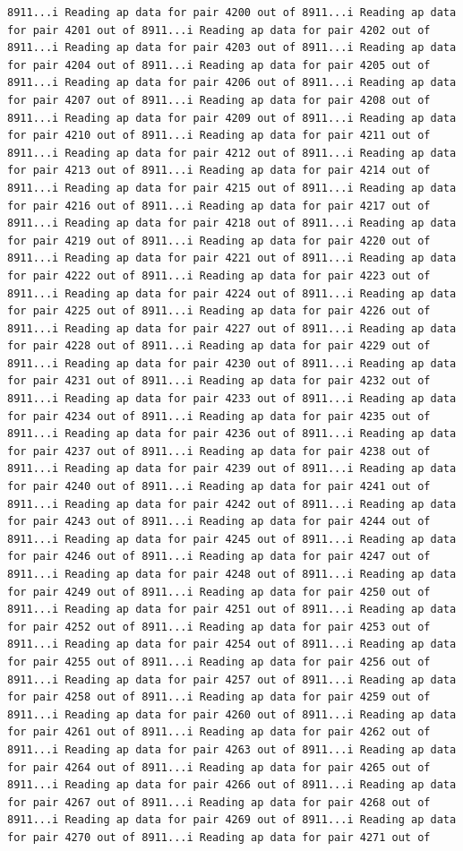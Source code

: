 \documentclass[
]{article}
\begin{document}
\begin{verbatim}
8911...i Reading ap data for pair 4200 out of 8911...i Reading ap data for pair 4201 out of 8911...i Reading ap data for pair 4202 out of 8911...i Reading ap data for pair 4203 out of 8911...i Reading ap data for pair 4204 out of 8911...i Reading ap data for pair 4205 out of 8911...i Reading ap data for pair 4206 out of 8911...i Reading ap data for pair 4207 out of 8911...i Reading ap data for pair 4208 out of 8911...i Reading ap data for pair 4209 out of 8911...i Reading ap data for pair 4210 out of 8911...i Reading ap data for pair 4211 out of 8911...i Reading ap data for pair 4212 out of 8911...i Reading ap data for pair 4213 out of 8911...i Reading ap data for pair 4214 out of 8911...i Reading ap data for pair 4215 out of 8911...i Reading ap data for pair 4216 out of 8911...i Reading ap data for pair 4217 out of 8911...i Reading ap data for pair 4218 out of 8911...i Reading ap data for pair 4219 out of 8911...i Reading ap data for pair 4220 out of 8911...i Reading ap data for pair 4221 out of 8911...i Reading ap data for pair 4222 out of 8911...i Reading ap data for pair 4223 out of 8911...i Reading ap data for pair 4224 out of 8911...i Reading ap data for pair 4225 out of 8911...i Reading ap data for pair 4226 out of 8911...i Reading ap data for pair 4227 out of 8911...i Reading ap data for pair 4228 out of 8911...i Reading ap data for pair 4229 out of 8911...i Reading ap data for pair 4230 out of 8911...i Reading ap data for pair 4231 out of 8911...i Reading ap data for pair 4232 out of 8911...i Reading ap data for pair 4233 out of 8911...i Reading ap data for pair 4234 out of 8911...i Reading ap data for pair 4235 out of 8911...i Reading ap data for pair 4236 out of 8911...i Reading ap data for pair 4237 out of 8911...i Reading ap data for pair 4238 out of 8911...i Reading ap data for pair 4239 out of 8911...i Reading ap data for pair 4240 out of 8911...i Reading ap data for pair 4241 out of 8911...i Reading ap data for pair 4242 out of 8911...i Reading ap data for pair 4243 out of 8911...i Reading ap data for pair 4244 out of 8911...i Reading ap data for pair 4245 out of 8911...i Reading ap data for pair 4246 out of 8911...i Reading ap data for pair 4247 out of 8911...i Reading ap data for pair 4248 out of 8911...i Reading ap data for pair 4249 out of 8911...i Reading ap data for pair 4250 out of 8911...i Reading ap data for pair 4251 out of 8911...i Reading ap data for pair 4252 out of 8911...i Reading ap data for pair 4253 out of 8911...i Reading ap data for pair 4254 out of 8911...i Reading ap data for pair 4255 out of 8911...i Reading ap data for pair 4256 out of 8911...i Reading ap data for pair 4257 out of 8911...i Reading ap data for pair 4258 out of 8911...i Reading ap data for pair 4259 out of 8911...i Reading ap data for pair 4260 out of 8911...i Reading ap data for pair 4261 out of 8911...i Reading ap data for pair 4262 out of 8911...i Reading ap data for pair 4263 out of 8911...i Reading ap data for pair 4264 out of 8911...i Reading ap data for pair 4265 out of 8911...i Reading ap data for pair 4266 out of 8911...i Reading ap data for pair 4267 out of 8911...i Reading ap data for pair 4268 out of 8911...i Reading ap data for pair 4269 out of 8911...i Reading ap data for pair 4270 out of 8911...i Reading ap data for pair 4271 out of 
\end{verbatim}
\end{document}
